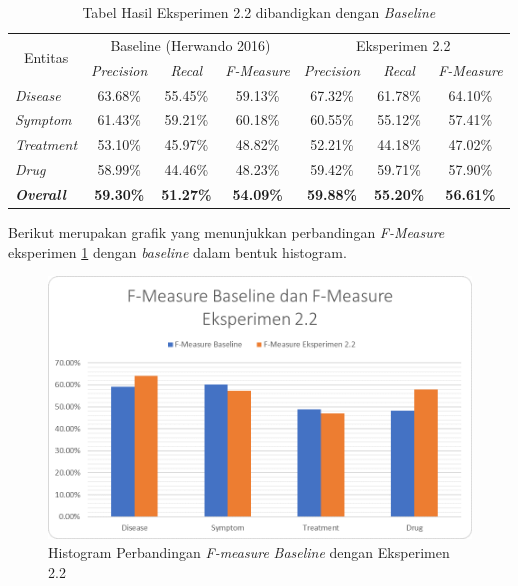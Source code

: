 	\begin{table}
		\centering
		\caption{Tabel Hasil Eksperimen 2.2 dibandigkan dengan \textit{Baseline}}
		\label{table:ekskamus}
		\begin{tabular}{|l|c|c|c|c|c|c|}
			\hline
			\multicolumn{1}{|c|}{\multirow{2}{*}{Entitas}} & \multicolumn{3}{c|}{Baseline (Herwando 2016)} & \multicolumn{3}{c|}{Eksperimen 2.2} \\ \cline{2-7} 
			\multicolumn{1}{|c|}{} & \textit{Precision} & \textit{Recal} & \textit{F-Measure} & \textit{Precision} & \textit{Recal} & \textit{F-Measure} \\ \hline
			\textit{Disease} & 63.68\% & 55.45\% & 59.13\% & 67.32\% & 61.78\% & 64.10\% \\ \hline
			\textit{Symptom} & 61.43\% & 59.21\% & 60.18\% & 60.55\% & 55.12\% & 57.41\% \\ \hline
			\textit{Treatment} & 53.10\% & 45.97\% & 48.82\% & 52.21\% & 44.18\% & 47.02\% \\ \hline
			\textit{Drug} & 58.99\% & 44.46\% & 48.23\% & 59.42\% & 59.71\% & 57.90\% \\ \hline
			\textit{\textbf{Overall}} & \textbf{59.30\%} & \textbf{51.27\%} & \textbf{54.09\%} & \textbf{59.88\%} & \textbf{55.20\%} & \textbf{56.61\%} \\ \hline
		\end{tabular}
	\end{table}
	
	Berikut merupakan grafik yang menunjukkan perbandingan \textit{F-Measure} eksperimen \ref{table:ekskamus} dengan \textit{baseline} dalam bentuk histogram.
	
	\begin{figure}
		\centering
		\includegraphics[width=0.85\linewidth]{images/histogram2}
		\caption{Histogram Perbandingan \textit{F-measure} \textit{Baseline} dengan Eksperimen 2.2}
		\label{fig:ekskamus}
	\end{figure}

